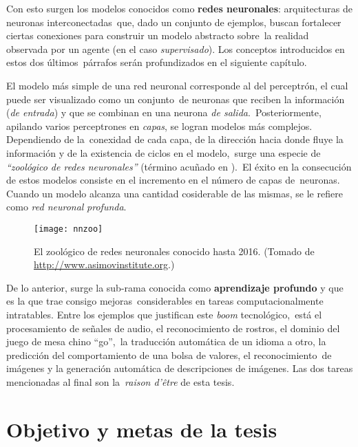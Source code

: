 Con esto surgen los modelos conocidos como \textbf{redes neuronales}: arquitecturas de neuronas interconectadas\
que, dado un conjunto de ejemplos, buscan fortalecer ciertas conexiones para construir un modelo abstracto sobre\
la realidad observada por un agente (en el caso \emph{supervisado}). Los conceptos introducidos en estos dos últimos\
párrafos serán profundizados en el siguiente capítulo.\par
El modelo más simple de una red neuronal corresponde al del perceptrón, el cual puede ser visualizado como un conjunto\
de neuronas que reciben la información (\emph{de entrada}) y que se combinan en una neurona \emph{de salida}.\
Posteriormente, apilando varios perceptrones en \emph{capas}, se logran modelos más complejos. Dependiendo de la\
conexidad de cada capa, de la dirección hacia donde fluye la información y de la existencia de ciclos en el modelo,\
surge una especie de \emph{``zoológico de redes neuronales''} (término acuñado en \cite{website:theasimovinstitute}).\
El éxito en la consecución de estos modelos consiste en el incremento en el número de capas de\
neuronas. Cuando un modelo alcanza una cantidad cosiderable de las mismas, se le refiere como \emph{red neuronal}
\emph{profunda}.

\begin{figure}[H]
  \centering
  \texttt{[image: nnzoo]}
  \caption{El zoológico de redes neuronales conocido hasta 2016.
    (Tomado de \url{http://www.asimovinstitute.org}.)
    \cite{website:theasimovinstitute}
  }
\end{figure}

De lo anterior, surge la sub-rama conocida como \textbf{aprendizaje profundo} y que es la que trae consigo mejoras\
considerables en tareas computacionalmente intratables. Entre los ejemplos que justifican este \emph{boom} tecnológico,\
está el procesamiento de señales de audio, el reconocimiento de rostros, el dominio del juego de mesa chino ``go'',\
la traducción automática de un idioma a otro, la predicción del comportamiento de una bolsa de valores, el reconocimiento\
de imágenes y la generación automática de descripciones de imágenes. Las dos tareas mencionadas al final son la\
\emph{raison d'être} de esta tesis.

\section{Objetivo y metas de la tesis}

